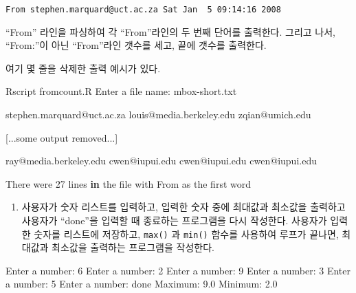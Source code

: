 \documentclass[
  letterpaper,
]{book}
\newenvironment{Shaded}{\begin{snugshade}}{\end{snugshade}}
\newcommand{\ControlFlowTok}[1]{\textcolor[rgb]{0.00,0.23,0.31}{\textbf{#1}}}
\newcommand{\DecValTok}[1]{\textcolor[rgb]{0.68,0.00,0.00}{#1}}
\newcommand{\FloatTok}[1]{\textcolor[rgb]{0.68,0.00,0.00}{#1}}
\newcommand{\NormalTok}[1]{\textcolor[rgb]{0.00,0.23,0.31}{#1}}
\newcommand{\SpecialCharTok}[1]{\textcolor[rgb]{0.37,0.37,0.37}{#1}}
\providecommand{\tightlist}{%
  \setlength{\itemsep}{0pt}\setlength{\parskip}{0pt}}\usepackage{longtable,booktabs,array}
\begin{document}
\texttt{From\ stephen.marquard@uct.ac.za\ Sat\ Jan\ \ 5\ 09:14:16\ 2008}

``From'' 라인을 파싱하여 각 ``From''라인의 두 번째 단어를 출력한다.
그리고 나서, ``From:''이 아닌 ``From''라인 갯수를 세고, 끝에 갯수를
출력한다.

여기 몇 줄을 삭제한 출력 예시가 있다.

\begin{Shaded}
\begin{Highlighting}[]
\NormalTok{Rscript fromcount.R}
\NormalTok{Enter a file name}\SpecialCharTok{:}\NormalTok{ mbox}\SpecialCharTok{{-}}\NormalTok{short.txt}

\NormalTok{stephen.marquard}\SpecialCharTok{@}\NormalTok{uct.ac.za}
\NormalTok{louis}\SpecialCharTok{@}\NormalTok{media.berkeley.edu}
\NormalTok{zqian}\SpecialCharTok{@}\NormalTok{umich.edu}

\NormalTok{[...some output removed...]}

\NormalTok{ray}\SpecialCharTok{@}\NormalTok{media.berkeley.edu}
\NormalTok{cwen}\SpecialCharTok{@}\NormalTok{iupui.edu}
\NormalTok{cwen}\SpecialCharTok{@}\NormalTok{iupui.edu}
\NormalTok{cwen}\SpecialCharTok{@}\NormalTok{iupui.edu}

\NormalTok{There were }\DecValTok{27}\NormalTok{ lines }\ControlFlowTok{in}\NormalTok{ the file with From as the first word}
\end{Highlighting}
\end{Shaded}

\begin{enumerate}
\def\labelenumi{\arabic{enumi}.}
\setcounter{enumi}{2}
\tightlist
\item
  사용자가 숫자 리스트를 입력하고, 입력한 숫자 중에 최대값과 최소값을
  출력하고 사용자가 ``done''을 입력할 때 종료하는 프로그램을 다시
  작성한다. 사용자가 입력한 숫자를 리스트에 저장하고, \texttt{max()} 과
  \texttt{min()} 함수를 사용하여 루프가 끝나면, 최대값과 최소값을
  출력하는 프로그램을 작성한다.
\end{enumerate}

\begin{Shaded}
\begin{Highlighting}[]
\NormalTok{Enter a number}\SpecialCharTok{:} \DecValTok{6}
\NormalTok{Enter a number}\SpecialCharTok{:} \DecValTok{2}
\NormalTok{Enter a number}\SpecialCharTok{:} \DecValTok{9}
\NormalTok{Enter a number}\SpecialCharTok{:} \DecValTok{3}
\NormalTok{Enter a number}\SpecialCharTok{:} \DecValTok{5}
\NormalTok{Enter a number}\SpecialCharTok{:}\NormalTok{ done}
\NormalTok{Maximum}\SpecialCharTok{:} \FloatTok{9.0}
\NormalTok{Minimum}\SpecialCharTok{:} \FloatTok{2.0}
\end{Highlighting}
\end{Shaded}
\end{document}
